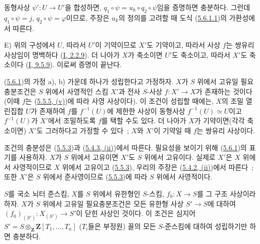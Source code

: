 
동형사상 $\psi':U\to U'$을 합성하면,
$q_1\circ\psi=u_k\circ q_2\circ\psi$임을 증명하면 충분하다. 그런데
$q_1\circ\psi=j$, $q_2\circ\psi=\varphi$이므로, 주장은 $u_k$의 정의를
고려할 때 도식 (\hyperref[II.5.6.1.1-ko]{5.6.1.1})의 가환성에서 따른다.

E) 위의 구성에서 $U$, 따라서 $U'$이 기약이므로 $X'$도 기약이고,
따라서 사상 $f$는 쌍유리 사상임이 명백하다
(\hyperref[I.2.2.9-ko]{I, 2.2.9}). 더 나아가 $X$가 축소이면 $U'$도
축소이고, 따라서 $X'$도 축소이다
(\hyperref[I.9.5.9-ko]{I, 9.5.9}). 이로써 증명이 끝난다.

\begin{corollary}[5.6.2]
\label{II.5.6.2-ko}
(\hyperref[II.5.6.1-ko]{5.6.1})의 가정 a), b) 가운데 하나가 성립한다고
가정하자. $X$가 $S$ 위에서 고유일 필요충분조건은 $S$ 위에서 사영적인
스킴 $X'$과 전사 $S$-사상 $f:X'\to X$가 존재하는 것이다(이때 $f$는
(\hyperref[II.5.5.5-ko]{5.5.5, (v)})에 따라 사영 사상이다). 이 조건이
성립할 때에는, $X$의 조밀 열린집합 $U$가 존재하여 $f$를
$f^{-1}(U)$에 제한한 사상이 동형사상 $f^{-1}(U)\simeq U$이고
$f^{-1}(U)$가 $X'$에서 조밀하도록 $f$를 택할 수도 있다. 더 나아가
$X$가 기약이면(각각 축소이면) $X'$도 그러하다고 가정할 수 있다~;
$X$와 $X'$이 기약일 때 $f$는 쌍유리 사상이다.
\end{corollary}

조건의 충분성은 (\hyperref[II.5.5.3-ko]{5.5.3})과
(\hyperref[II.5.4.3-ko]{5.4.3, (ii)})에서 따른다. 필요성을 보이기 위해
(\hyperref[II.5.6.1-ko]{5.6.1})의 표기를 사용하자. $X$가 $S$ 위에서
고유이면 $X'$도 $S$ 위에서 고유이다. 실제로 $X'$은 $X$ 위에서
사영적이므로 $X$ 위에서 고유이고
(\hyperref[II.5.5.3-ko]{5.5.3}), 우리의 주장은
(\hyperref[II.5.4.2-ko]{5.4.2, (ii)})에서 따른다~; 또한 $X'$은 $S$
위에서 준사영이므로 (\hyperref[II.5.5.3-ko]{5.5.3})에 따라 $S$ 위에서
사영적이다.

\begin{corollary}[5.6.3]
\label{II.5.6.3-ko}
$S$를 국소 뇌터 준스킴, $X$를 $S$ 위에서 유한형인 $S$-스킴,
$f_0:X\to S$를 그 구조 사상이라 하자. $X$가 $S$ 위에서 고유일
필요충분조건은 모든 유한형 사상 $S'\to S$에 대하여
$(f_0)_{(S')}:X_{(S')}\to S'$이 닫힌 사상인 것이다. 이 조건은 심지어
$S'=S\otimes_{\mathbf Z}\mathbf Z[T_1,\ldots,T_n]$ ($T_i$들은
부정원) 꼴의 모든 $S$-준스킴에 대하여 성립하기만 하면 충분하다.
\end{corollary}

